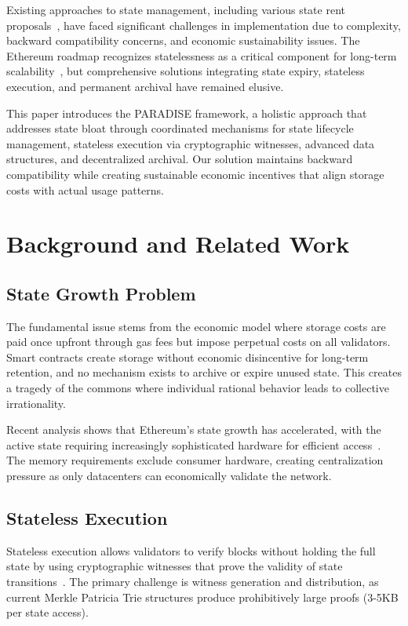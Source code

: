 \documentclass{article}
\begin{document}
Existing approaches to state management, including various state rent proposals~\cite{buterin2021statesize}, have faced significant challenges in implementation due to complexity, backward compatibility concerns, and economic sustainability issues. The Ethereum roadmap recognizes statelessness as a critical component for long-term scalability~\cite{ethereumorg2025statelessness}, but comprehensive solutions integrating state expiry, stateless execution, and permanent archival have remained elusive.

This paper introduces the PARADISE framework, a holistic approach that addresses state bloat through coordinated mechanisms for state lifecycle management, stateless execution via cryptographic witnesses, advanced data structures, and decentralized archival. Our solution maintains backward compatibility while creating sustainable economic incentives that align storage costs with actual usage patterns.

\section{Background and Related Work}

\subsection{State Growth Problem}

The fundamental issue stems from the economic model where storage costs are paid once upfront through gas fees but impose perpetual costs on all validators. Smart contracts create storage without economic disincentive for long-term retention, and no mechanism exists to archive or expire unused state. This creates a tragedy of the commons where individual rational behavior leads to collective irrationality.

Recent analysis shows that Ethereum's state growth has accelerated, with the active state requiring increasingly sophisticated hardware for efficient access~\cite{konstantopoulos2024stategrowth}. The memory requirements exclude consumer hardware, creating centralization pressure as only datacenters can economically validate the network.

\subsection{Stateless Execution}

Stateless execution allows validators to verify blocks without holding the full state by using cryptographic witnesses that prove the validity of state transitions~\cite{ethereumorg2025statelessness}. The primary challenge is witness generation and distribution, as current Merkle Patricia Trie structures produce prohibitively large proofs (3-5KB per state access).
\end{document}
